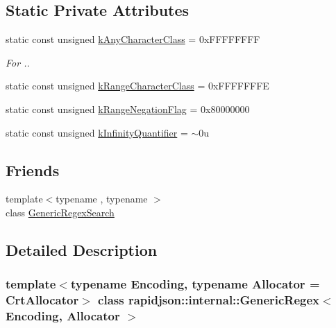 \subsection*{Static Private Attributes}
\begin{DoxyCompactItemize}
\item 
static const unsigned \mbox{\hyperlink{classrapidjson_1_1internal_1_1_generic_regex_a2ee5fdb29d3092832aad021e5f5e383b}{k\+Any\+Character\+Class}} = 0x\+F\+F\+F\+F\+F\+F\+FF
\begin{DoxyCompactList}\small\item\em For \textquotesingle{}.\textquotesingle{}. \end{DoxyCompactList}\item 
static const unsigned \mbox{\hyperlink{classrapidjson_1_1internal_1_1_generic_regex_aa7d29b7d0fecaf6b59548de68578a4a7}{k\+Range\+Character\+Class}} = 0x\+F\+F\+F\+F\+F\+F\+FE
\item 
static const unsigned \mbox{\hyperlink{classrapidjson_1_1internal_1_1_generic_regex_a7290d7984a4931d577257a7620ca8522}{k\+Range\+Negation\+Flag}} = 0x80000000
\item 
static const unsigned \mbox{\hyperlink{classrapidjson_1_1internal_1_1_generic_regex_a1fa843a0465589454b91bec76518bf95}{k\+Infinity\+Quantifier}} = $\sim$0u
\end{DoxyCompactItemize}
\subsection*{Friends}
\begin{DoxyCompactItemize}
\item 
{\footnotesize template$<$typename , typename $>$ }\\class \mbox{\hyperlink{classrapidjson_1_1internal_1_1_generic_regex_a919008cc046ab9f1c09609f1fc143986}{Generic\+Regex\+Search}}
\end{DoxyCompactItemize}


\subsection{Detailed Description}
\subsubsection*{template$<$typename Encoding, typename Allocator = Crt\+Allocator$>$\newline
class rapidjson\+::internal\+::\+Generic\+Regex$<$ Encoding, Allocator $>$}

